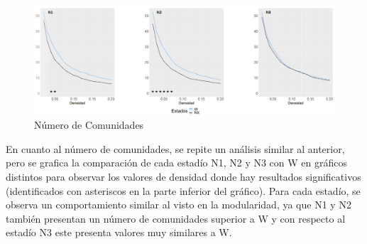 \begin{figure}[H]
    \centering
    \includegraphics[width=\textwidth]{img/3_2_N_comunidades.jpg}
    \caption{Número de Comunidades}
    \label{fig:3_2_N_comunidades}
\end{figure}


En cuanto al número de comunidades, se repite un análisis similar al anterior, pero se grafica la comparación de cada estadío N1, N2 y N3 con W en gráficos distintos para observar los valores de densidad donde hay resultados significativos (identificados con asteriscos en la parte inferior del gráfico). Para cada estadío, se observa un comportamiento similar al visto en la modularidad, ya que N1 y N2 también presentan un número de comunidades superior a W y con respecto al estadío N3 este presenta valores muy similares a W.

